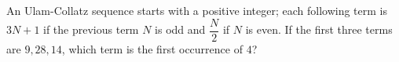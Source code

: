An Ulam-Collatz sequence starts with a positive integer; each following term is $3N+1$ if the previous term $N$ is odd and $\dfrac {N}{2}$ if $N$ is even. If the first three terms are $9,28,14$, which term is the first occurrence of $4$?
